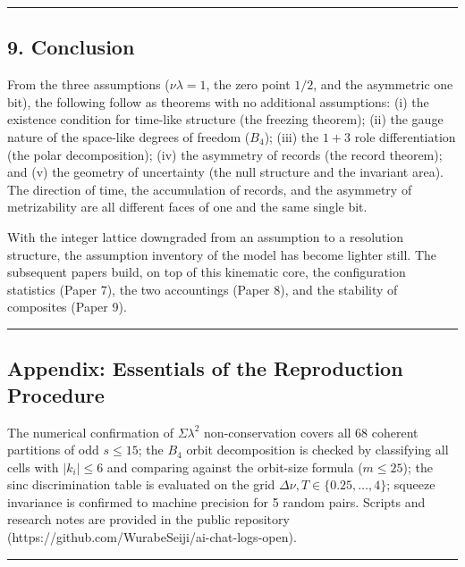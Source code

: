 \documentclass[
]{article}
\begin{document}
\begin{center}\rule{0.5\linewidth}{0.5pt}\end{center}

\subsection{9. Conclusion}\label{conclusion}

From the three assumptions (\(\nu\lambda=1\), the zero point \(1/2\),
and the asymmetric one bit), the following follow as theorems with no
additional assumptions: (i) the existence condition for time-like
structure (the freezing theorem); (ii) the gauge nature of the
space-like degrees of freedom (\(B_4\)); (iii) the \(1{+}3\) role
differentiation (the polar decomposition); (iv) the asymmetry of records
(the record theorem); and (v) the geometry of uncertainty (the null
structure and the invariant area). The direction of time, the
accumulation of records, and the asymmetry of metrizability are all
different faces of one and the same single bit.

With the integer lattice downgraded from an assumption to a resolution
structure, the assumption inventory of the model has become lighter
still. The subsequent papers build, on top of this kinematic core, the
configuration statistics (Paper 7), the two accountings (Paper 8), and
the stability of composites (Paper 9).

\begin{center}\rule{0.5\linewidth}{0.5pt}\end{center}

\subsection{Appendix: Essentials of the Reproduction
Procedure}\label{appendix-essentials-of-the-reproduction-procedure}

The numerical confirmation of \(\Sigma\lambda^2\) non-conservation
covers all 68 coherent partitions of odd \(s\le15\); the \(B_4\) orbit
decomposition is checked by classifying all cells with \(|k_i|\le6\) and
comparing against the orbit-size formula (\(m\le25\)); the sinc
discrimination table is evaluated on the grid
\(\Delta\nu, T\in\{0.25,\ldots,4\}\); squeeze invariance is confirmed to
machine precision for 5 random pairs. Scripts and research notes are
provided in the public repository
(https://github.com/WurabeSeiji/ai-chat-logs-open).

\begin{center}\rule{0.5\linewidth}{0.5pt}\end{center}
\end{document}
